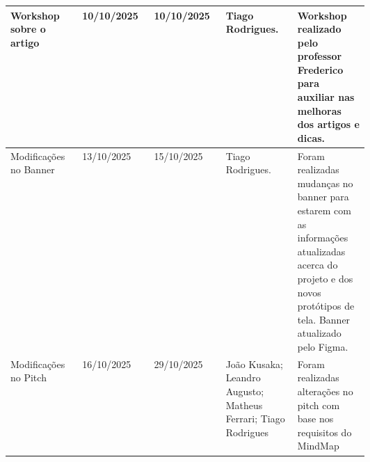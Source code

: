 \documentclass[
landscape,
  a4paper,
  12pt,
  english,
  brazilian,
]{article}
\begin{document}
 \begin{table}[]
\centering


\begin{tabular}{|>{\raggedright\arraybackslash}p{0.2\linewidth}|l|l|>{\raggedright\arraybackslash}p{0.2\linewidth}|>{\raggedright\arraybackslash}p{0.2\linewidth}|}

\hline

 Workshop sobre o artigo& 10/10/2025& 10/10/2025& Tiago Rodrigues.&Workshop realizado pelo professor Frederico para auxiliar nas melhoras dos artigos e dicas.\\\hline
                  Modificações no Banner&                            13/10/2025&                15/10/2025&                 Tiago Rodrigues.&                                  Foram realizadas mudanças no banner para estarem com as informações atualizadas acerca do projeto e dos novos protótipos de tela. Banner atualizado pelo Figma.\\ \hline
                  Modificações no Pitch&                            16/10/2025&                29/10/2025&                 João Kusaka; Leandro Augusto; Matheus Ferrari; Tiago Rodrigues&                                  Foram realizadas alterações no pitch com base nos requisitos do MindMap\\ \hline                
\end{tabular}


\end{table}
\end{document}
